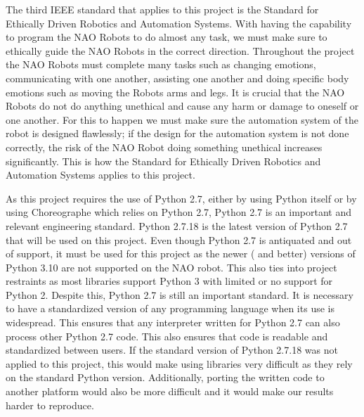 The third IEEE standard that applies to this project is the Standard for Ethically Driven Robotics and Automation Systems. With having the capability to program the NAO Robots to do almost any task, we must make sure to ethically guide the NAO Robots in the correct direction. Throughout the project the NAO Robots must complete many tasks such as changing emotions, communicating with one another, assisting one another and doing specific body emotions such as moving the Robots arms and legs. It is crucial that the NAO Robots do not do anything unethical and cause any harm or damage to oneself or one another. For this to happen we must make sure the automation system of the robot is designed flawlessly; if the design for the automation system is not done correctly, the risk of the NAO Robot doing something unethical increases significantly. This is how the Standard for Ethically Driven Robotics and Automation Systems applies to this project. \par 

As this project requires the use of Python 2.7, either by using Python itself or by using Choreographe which relies on Python 2.7, Python 2.7 is an important and relevant engineering standard. Python 2.7.18 is the latest version of Python 2.7 that will be used on this project. Even though Python 2.7 is antiquated and out of support, it must be used for this project as the newer ( and better) versions of Python 3.10 are not supported on the NAO robot. This also ties into project restraints as most libraries support Python 3 with limited or no support for Python 2. Despite this, Python 2.7 is still an important standard. It is necessary to have a standardized version of any programming language when its use is widespread. This ensures that any interpreter written for Python 2.7 can also process other Python 2.7 code. This also ensures that code is readable and standardized between users. If the standard version of Python 2.7.18 was not applied to this project, this would make using libraries very difficult as they rely on the standard Python version. Additionally, porting the written code to another platform would also be more difficult and it would make our results harder to reproduce. \cite{python} \par


